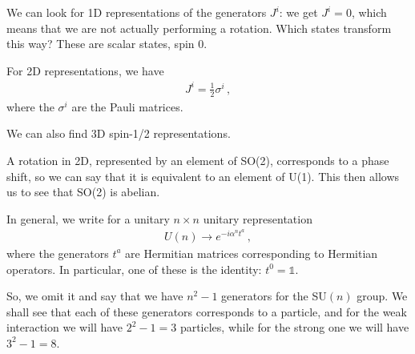 \documentclass[main.tex]{subfiles}
\begin{document}
We can look for 1D representations of the generators \(J^{i}\): we get \(J^{i} = 0\), which means that we are not actually performing a rotation.
Which states transform this way? These are scalar states, spin 0. 

For 2D representations, we have 
%
\begin{align}
J^{i} =\frac{1}{2} \sigma^{i} 
\,,
\end{align}
%
where the \(\sigma^{i}\) are the Pauli matrices.

We can also find 3D spin-1/2 representations. 

A rotation in 2D, represented by an element of SO(2), corresponds to a phase shift, so we can say that it is equivalent to an element of U(1).
This then allows us to see that SO(2) is abelian. 

In general, we write for a unitary \(n \times n\) unitary representation
%
\begin{align}
U(n) \rightarrow e^{-i \alpha^{n} t^{a}}
\,,
\end{align}
%
where the generators \(t^{a}\) are Hermitian matrices corresponding to Hermitian operators. 
In particular, one of these is the identity: \(t^{0} = \mathbb{1}\). 

So, we omit it and  say that we have \(n^2-1\) generators for the SU\((n)\) group.
We shall see that each of these generators corresponds to a particle, and for the weak interaction we will have \(2^2-1 = 3\) particles, while for the strong one we will have \(3^2-1=8\). 
\end{document}
